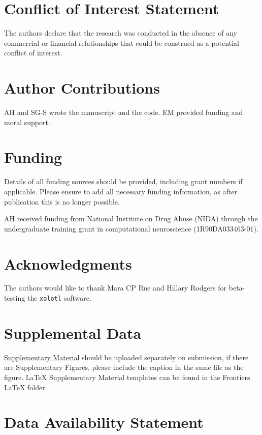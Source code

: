 \documentclass[utf8]{frontiersSCNS} %
\begin{document}
\section*{Conflict of Interest Statement}

The authors declare that the research was conducted in the absence of any commercial or financial relationships that could be construed as a potential conflict of interest.

\section*{Author Contributions}

AH and SG-S wrote the manuscript and the code. EM provided funding and moral support.

\section*{Funding}
Details of all funding sources should be provided, including grant numbers if applicable. Please ensure to add all necessary funding information, as after publication this is no longer possible.

AH received funding from National Institute on Drug Abuse (NIDA) through the undergraduate training grant in computational neuroscience (1R90DA033463-01).

\section*{Acknowledgments}
The authors would like to thank Mara CP Rue and Hillary Rodgers for beta-testing the \texttt{xolotl} software.

\section*{Supplemental Data}
 \href{http://home.frontiersin.org/about/author-guidelines#SupplementaryMaterial}{Supplementary Material} should be uploaded separately on submission, if there are Supplementary Figures, please include the caption in the same file as the figure. LaTeX Supplementary Material templates can be found in the Frontiers LaTeX folder.

\section*{Data Availability Statement}
\end{document}
